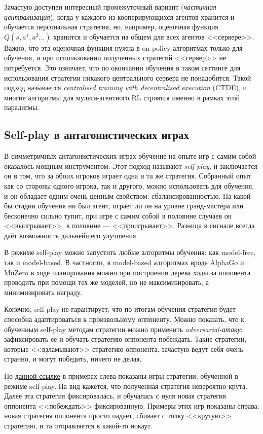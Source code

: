 Зачастую доступен интересный промежуточный вариант (\emph{частичная централизация}), когда у каждого из кооперирующихся агентов хранится и обучается персональная стратегия, но, например, оценочная функция $Q(s, a^1, a^2 \dots)$ хранится и обучается на общем для всех агентов <<сервере>>. Важно, что эта оценочная функция нужна в on-policy алгоритмах только для обучения, и при использовании полученных стратегий <<сервер>> не потребуется. Это означает, что по окончании обучения в таком сеттинге для использования стратегии никакого центрального сервера не понадобится. Такой подход называется \emph{centralised training with decentralised execution} (CTDE), и многие алгоритмы для мульти-агентного RL строятся именно в рамках этой парадигмы.

\subsection{Self-play в антагонистических играх}

В симметричных антагонистических играх обучение на опыте игр с самим собой оказалось мощным инструментом. Этот подход называют \emph{self-play}, и заключается он в том, что за обоих игроков играет одна и та же стратегия. Собранный опыт как со стороны одного игрока, так и другого, можно использовать для обучения, и он обладает одним очень ценным свойством: сбалансированностью. На какой бы стадии обучения ни был агент, играет ли он на уровне гранд-мастера или бесконечно сильно тупит, при игре с самим собой в половине случаев он <<выигрывает>>, в половине --- <<проигрывает>>. Разница в сигнале всегда даёт возможность дальнейшего улучшения.

В режиме self-play можно запустить любые алгоритмы обучения: как model-free, так и model-based. В частности, в model-based алгоритмах вроде AlphaGo и MuZero в ходе планирования можно при построении дерева ходы за оппонента проводить при помощи тех же моделей, но не максимизировать, а минимизировать награду.

Конечно, self-play не гарантирует, что по итогам обучения стратегия будет способна адаптироваться к произвольному оппоненту. Можно показать, что к обученным self-play методам стратегии можно применить \emph{adversarial-атаку}: зафиксировать её и обучать стратегию оппонента побеждать. Такие стратегии, которые <<взламывают>> стратегию оппонента, зачастую ведут себя очень странно, и могут победить, ничего не делая.

\begin{example}
По \href{https://adversarialpolicies.github.io/}{данной ссылке} в примерах слева показаны игры стратегии, обученной в режиме self-play. На вид кажется, что полученная стратегия невероятно крута. Далее эта стратегия фиксировалась, и обучалась с нуля новая стратегия оппонента <<побеждать>> фиксированную. Примеры этих игр показаны справа: новая стратегия оппонента просто падает, сбивает с толку <<крутую>> стратегию, и та отправляется в какой-то нокаут.
\end{example}

